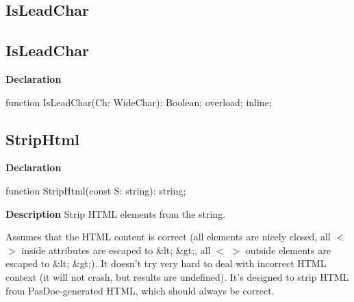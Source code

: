 \documentclass{report}
\newif\ifpdf
\begin{document}
\subsection*{\large{\textbf{IsLeadChar}}\normalsize\hspace{1ex}\hrulefill}
\else
\subsection*{IsLeadChar}
\fi
\label{PasDoc_Utils-IsLeadChar}
\begin{list}{}{
\setlength{\itemindent}{0cm}
\setlength{\listparindent}{0cm}
\setlength{\leftmargin}{\evensidemargin}
\addtolength{\leftmargin}{\tmplength}
\settowidth{\labelsep}{X}
\addtolength{\leftmargin}{\labelsep}
\setlength{\labelwidth}{\tmplength}
}
\item[\textbf{Declaration}\hfill]
\ifpdf
\begin{flushleft}
\fi
\begin{ttfamily}
function IsLeadChar(Ch: WideChar): Boolean; overload; inline;\end{ttfamily}

\ifpdf
\end{flushleft}
\fi

\end{list}
\ifpdf
\subsection*{\large{\textbf{StripHtml}}\normalsize\hspace{1ex}\hrulefill}
\else
\subsection*{StripHtml}
\fi
\label{PasDoc_Utils-StripHtml}
\begin{list}{}{
\setlength{\itemindent}{0cm}
\setlength{\listparindent}{0cm}
\setlength{\leftmargin}{\evensidemargin}
\addtolength{\leftmargin}{\tmplength}
\settowidth{\labelsep}{X}
\addtolength{\leftmargin}{\labelsep}
\setlength{\labelwidth}{\tmplength}
}
\item[\textbf{Declaration}\hfill]
\ifpdf
\begin{flushleft}
\fi
\begin{ttfamily}
function StripHtml(const S: string): string;\end{ttfamily}

\ifpdf
\end{flushleft}
\fi

\par
\item[\textbf{Description}]
Strip HTML elements from the string.

Assumes that the HTML content is correct (all elements are nicely closed, all {$<$} {$>$} inside attributes are escaped to {\&}lt; {\&}gt;, all {$<$} {$>$} outside elements are escaped to {\&}lt; {\&}gt;). It doesn't try very hard to deal with incorrect HTML context (it will not crash, but results are undefined). It's designed to strip HTML from PasDoc{-}generated HTML, which should always be correct.

\end{list}
\ifpdf
\end{document}
